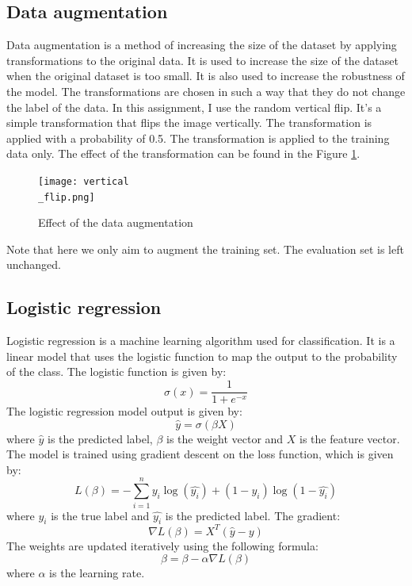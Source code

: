 \documentclass{article}
\begin{document}
\subsection{Data augmentation}
\label{subsec:augmentation}
Data augmentation is a method of increasing the size of the dataset by applying transformations to the original data. It is used to increase the size of the dataset when the original dataset is too small. It is also used to increase the robustness of the model. The transformations are chosen in such a way that they do not change the label of the data. In this assignment, I use the random vertical flip. It's a simple transformation that flips the image vertically. The transformation is applied with a probability of 0.5. The transformation is applied to the training data only. The effect of the transformation can be found in the Figure \ref{fig:augmentation}.

\begin{figure}[ht]
    \centering
    \texttt{[image: vertical\\\_flip.png]}
    \caption{Effect of the data augmentation}
    \label{fig:augmentation}
\end{figure}
Note that here we only aim to augment the training set. The evaluation set is left unchanged.

\subsection{Logistic regression}
\label{subsec:logistic_regression}
Logistic regression is a machine learning algorithm used for classification. It is a linear model that uses the logistic function to map the output to the probability of the class. The logistic function is given by:
\begin{equation}
    \sigma(x) = \frac{1}{1 + e^{-x}}
\end{equation}
The logistic regression model output is given by:
\begin{equation}
    \hat{y} = \sigma(\beta X)
\end{equation}
where $\hat{y}$ is the predicted label, $\beta$ is the weight vector and $X$ is the feature vector. The model is trained using gradient descent on the loss function, which is given by:
\begin{equation}
    L(\beta) = -\sum_{i=1}^{n} y_i \log(\hat{y_i}) + (1 - y_i) \log(1 - \hat{y_i})
\end{equation}
where $y_i$ is the true label and $\hat{y_i}$ is the predicted label.
The gradient:
\begin{equation}
    \nabla L(\beta) = X^T(\hat{y} - y)
\end{equation}
The weights are updated iteratively using the following formula:
\begin{equation}
    \beta = \beta - \alpha \nabla L(\beta)
\end{equation}
where $\alpha$ is the learning rate.
\end{document}

